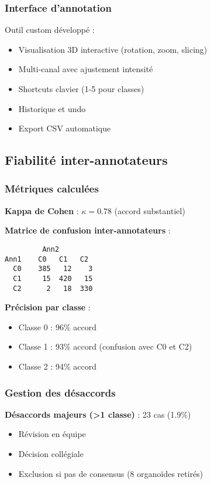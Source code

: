 \subsubsection{Interface d'annotation}

Outil custom développé :
\begin{itemize}
    \item Visualisation 3D interactive (rotation, zoom, slicing)
    \item Multi-canal avec ajustement intensité
    \item Shortcuts clavier (1-5 pour classes)
    \item Historique et undo
    \item Export CSV automatique
\end{itemize}

\subsection{Fiabilité inter-annotateurs}

\subsubsection{Métriques calculées}

\textbf{Kappa de Cohen} : $\kappa = 0.78$ (accord substantiel)

\textbf{Matrice de confusion inter-annotateurs} :
\begin{verbatim}
         Ann2
Ann1    C0   C1   C2
  C0    385   12    3
  C1     15  420   15
  C2      2   18  330
\end{verbatim}

\textbf{Précision par classe} :
\begin{itemize}
    \item Classe 0 : 96\% accord
    \item Classe 1 : 93\% accord (confusion avec C0 et C2)
    \item Classe 2 : 94\% accord
\end{itemize}

\subsubsection{Gestion des désaccords}

\textbf{Désaccords majeurs (>1 classe)} : 23 cas (1.9\%)
\begin{itemize}
    \item Révision en équipe
    \item Décision collégiale
    \item Exclusion si pas de consensus (8 organoïdes retirés)
\end{itemize}

